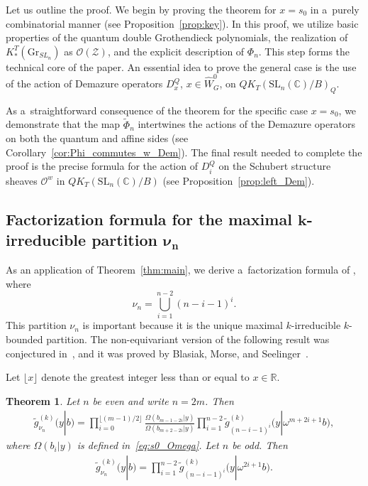 \documentclass[pdftex]{sigma}
\numberwithin{equation}{section}
\newcommand{\C}{\mathbb{C}}
\newcommand{\Gr}{\mathrm{Gr}}
\newcommand{\SL}{\mathrm{SL}}
\newtheorem{Theorem}{Theorem}[section]
\theoremstyle{definition}
\begin{document}
Let us outline the proof.
We begin by proving the theorem for $x=s_0$ in a~purely combinatorial manner (see Proposition~\ref{prop:key}).
In this proof, we utilize basic properties of the quantum double Grothendieck polynomials, the realization of $K_*^T(\Gr_{SL_n})$ as $\mathscr{O}(\mathscr{Z})$, and the explicit description of $\Phi_n$.
This step forms the technical core of the paper.
An essential idea to prove the general case is the use of the action of Demazure operators $D_x^Q$, $x\in \hat{W}_G^0$, on $QK_T(\SL_n(\C)/B)_Q$.

As a~straightforward consequence of the theorem for the specific case
$x=s_0$,
we demonstrate that the map $\tilde{\Phi}_n$
intertwines the actions of the Demazure operators on both the quantum and affine sides (see Corollary~\ref{cor:Phi_commutes_w_Dem}).
The final result needed to complete the proof is the
precise formula for the action of
$D_i^Q$ on the Schubert structure sheaves $\mathscr{O}^w$ in
$QK_T(\SL_n(\C)/B)$
(see Proposition~\ref{prop:left_Dem}).

\subsection[Factorization formula for the maximal k-irreducible partition nu\_n]{Factorization formula for the maximal $\boldsymbol{k}$-irreducible partition $\boldsymbol{\nu_n}$}\label{ssec:fac max}
As an application of
Theorem~\ref{thm:main}, we derive a~factorization formula of , where
\[
\nu_n=\bigcup_{i=1}^{n-2}(n-i-1)^i.
\]
This partition $\nu_n$ is important because it is the unique maximal $k$-irreducible $k$-bounded partition.
The non-equivariant version of the following result was conjectured in~\cite{IIM}, and it was proved by Blasiak, Morse, and Seelinger~\cite{BMS}.

Let $\lfloor x\rfloor$ denote the greatest integer less than or equal to $x\in \mathbb{R}$.
\begin{Theorem}\label{thm:max factor}
Let $n$ be even and write $n = 2m$. Then
\begin{align}
\label{eq:even}
\tilde{g}^{(k)}_{\nu_n}(y|b)
= \prod_{i=0}^{\lfloor (m-1)/2 \rfloor}
 \frac{\Omega(b_{m-1-2i} | y)}{\Omega(b_{m+2-2i} | y)}
 \prod_{i=1}^{n-2}
 \tilde{g}^{(k)}_{(n-i-1)^i}\bigl(y | \omega^{m+2i+1} b\bigr),
\end{align}
where
$\Omega(b_i | y)$ is defined in~\eqref{eq:s0_Omega}.
Let $n$ be odd. Then
\begin{align}
\label{eq:odd}
\tilde{g}^{(k)}_{\nu_n}(y|b)
= \prod_{i=1}^{n-2}
 \tilde{g}^{(k)}_{(n-i-1)^i}\bigl(y | \omega^{2i+1} b\bigr).
\end{align}
\end{Theorem}
\end{document}
